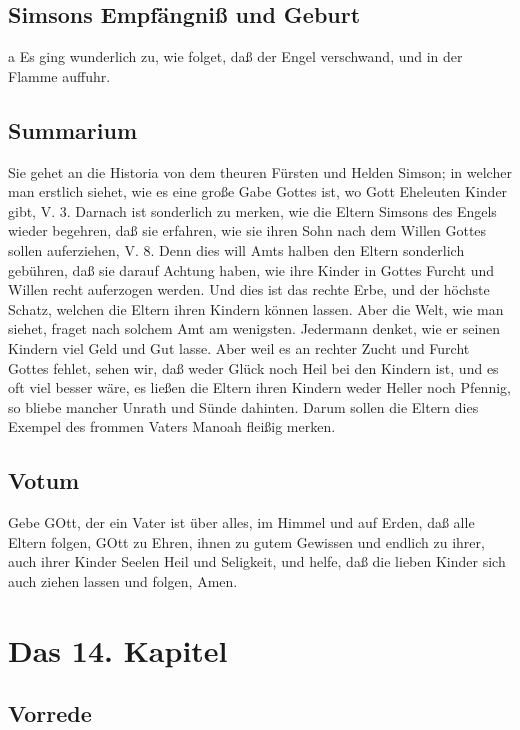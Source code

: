 \section{Simsons Empfängniß und Geburt}

a Es ging wunderlich zu, wie folget, daß der Engel verschwand, und in der Flamme auffuhr.
\section{Summarium}

Sie gehet an die Historia von dem theuren Fürsten und Helden Simson; in welcher man erstlich siehet, wie es eine große Gabe Gottes ist, wo Gott Eheleuten Kinder gibt, V. 3. Darnach ist sonderlich zu merken, wie die Eltern Simsons des Engels wieder begehren, daß sie erfahren, wie sie ihren Sohn nach dem Willen Gottes sollen auferziehen, V. 8. Denn dies will Amts halben den Eltern sonderlich gebühren, daß sie darauf Achtung haben, wie ihre Kinder in Gottes Furcht und Willen recht auferzogen werden. Und dies ist das rechte Erbe, und der höchste Schatz, welchen die Eltern ihren Kindern können lassen. Aber die Welt, wie man siehet, fraget nach solchem Amt am wenigsten. Jedermann denket, wie er seinen Kindern viel Geld und Gut lasse. Aber weil es an rechter Zucht und Furcht Gottes fehlet, sehen wir, daß weder Glück noch Heil bei den Kindern ist, und es oft viel besser wäre, es ließen die Eltern ihren Kindern weder Heller noch Pfennig, so bliebe mancher Unrath und Sünde dahinten. Darum sollen die Eltern dies Exempel des frommen Vaters Manoah fleißig merken.

\section{Votum}

Gebe GOtt, der ein Vater ist über alles, im Himmel und auf Erden, daß alle Eltern folgen, GOtt zu Ehren, ihnen zu gutem Gewissen und endlich zu ihrer, auch ihrer Kinder Seelen Heil und Seligkeit, und helfe, daß die lieben Kinder sich auch ziehen lassen und folgen, Amen.

\chapter{Das 14. Kapitel}

\section{Vorrede}

